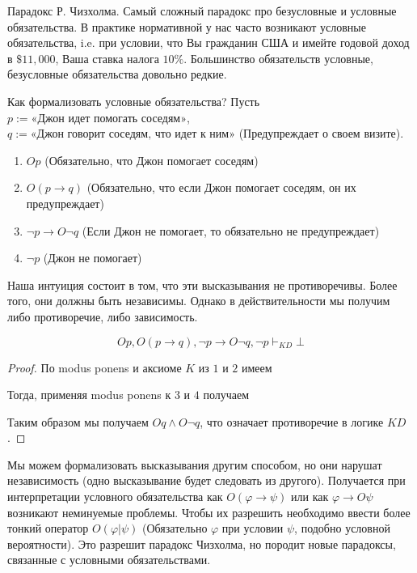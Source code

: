 \documentclass[openany]{book}
\theoremstyle{plain}
\theoremstyle{definition}
\begin{document}
Парадокс Р. Чизхолма. Самый сложный парадокс про безусловные и условные обязательства. В практике нормативной у нас часто возникают условные обязательства, i.e. при условии, что Вы гражданин США и имейте годовой доход в \(\$11,000\), Ваша ставка налога \(10\%\). Большинство обязательств условные, безусловные обязательства довольно редкие. 

Как формализовать условные обязательства? Пусть \(p := \text{«Джон идет помогать соседям»}\), \(q := \text{«Джон говорит соседям, что идет к ним»}\) (Предупреждает о своем визите).

\begin{enumerate}
    \item \(O p\) (Обязательно, что Джон помогает соседям)
    \item \(O (p \to q)\) (Обязательно, что если Джон помогает соседям, он их предупреждает)
    \item \(\neg p \to O \neg q\) (Если Джон не помогает, то обязательно не предупреждает)
    \item \(\neg p\) (Джон не помогает)
\end{enumerate}

Наша интуиция состоит в том, что эти высказывания не противоречивы. Более того, они должны быть независимы. Однако в действительности мы получим либо противоречие, либо зависимость. 

\[O p, O (p \to q), \neg p \to O \neg q, \neg p \vdash_{K D} \bot\]

\begin{proof}
    По modus ponens и аксиоме \(K\) из \(1\) и \(2\) имеем

    \begin{prooftree}
    \end{prooftree}

    Тогда, применяя modus ponens к \(3\) и \(4\) получаем

    \begin{prooftree}
    \end{prooftree}

    Таким образом мы получаем \(O q \land O \neg q\), что означает противоречие в логике \(K D\).

\end{proof}

Мы можем формализовать высказывания другим способом, но они нарушат независимость (одно высказывание будет следовать из другого). Получается при интерпретации условного обязательства как \(O (\varphi \to \psi)\) или как \(\varphi \to O \psi\) возникают неминуемые проблемы. Чтобы их разрешить необходимо ввести более тонкий оператор \(O(\varphi | \psi)\) (Обязательно \(\varphi\) при условии \(\psi\), подобно условной вероятности). Это разрешит парадокс Чизхолма, но породит новые парадоксы, связанные с условными обязательствами. 
\end{document}
